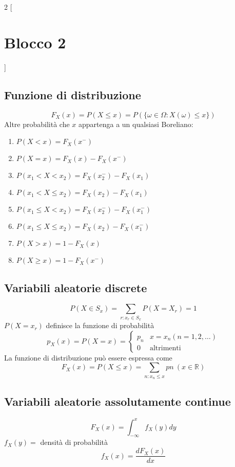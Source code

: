 \begin{multicols*}{2}
[\section*{Blocco 2}]

\subsection*{Funzione di distribuzione}
$$
F_X(x) = P(X \le x) = P(\{\omega \in \Omega : X(\omega) \le x\})
$$
Altre probabilità che $x$ appartenga a un qualsiasi Boreliano:
\begin{enumerate}
    \item $P(X < x) = F_X(x^-)$
    \item $P(X = x) = F_X(x) - F_X(x^-)$
    \item $P(x_1 < X < x_2) = F_X(x_2^-) - F_X(x_1)$
    \item $P(x_1 < X \le x_2) = F_X(x_2) - F_X(x_1)$
    \item $P(x_1 \le X < x_2) = F_X(x_2^-) - F_X(x_1^-)$
    \item $P(x_1 \le X \le x_2) = F_X(x_2) - F_X(x_1^-)$
    \item $P(X > x) = 1 - F_X(x)$
    \item $P(X \ge x) = 1 - F_X(x^-)$
\end{enumerate}

\subsection*{Variabili aleatorie discrete}
$$
P(X \in S_x) = \sum_{r : x_r \in S_x}P(X = X_r) = 1
$$
$P(X = x_r)$ definisce la funzione di probabilità
$$
p_X(x) = P(X = x) =
\begin{cases}
    p_n & x = x_n (n = 1,2,\dots)\\
    0 & \text{altrimenti}
\end{cases}
$$
La funzione di distribuzione può essere espressa come
$$
F_X(x) = P(X \le x) = \sum_{n: x_n \le x} pn \ (x \in \mathbb{R})
$$

\subsection*{Variabili aleatorie assolutamente continue}
$$F_X(x) = \int_{-\infty}^{x} f_X(y)dy$$
$f_X(y) = $ densità di probabilità
$$f_X(x) = \frac{dF_X(x)}{dx}$$


\end{multicols*}
